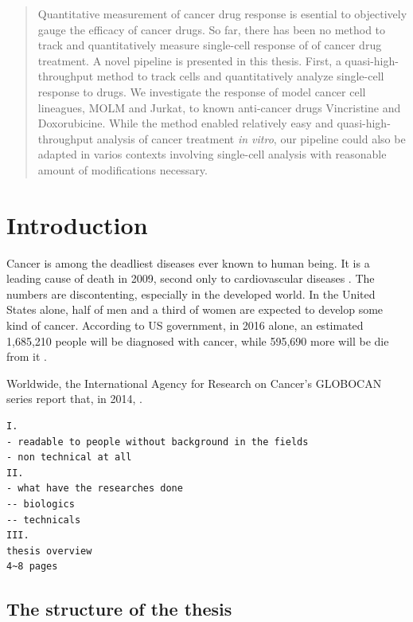 \documentclass[pdftex,12pt,a4paper]{report}
\begin{document}
\newpage


\begin{abstract}
Quantitative measurement of cancer drug response is esential to objectively gauge the efficacy of cancer drugs. So far, there has been no method to track and  quantitatively measure single-cell response of of cancer drug treatment. A novel pipeline is presented in this thesis. First, a quasi-high-throughput method to track cells and quantitatively analyze single-cell response to drugs. We investigate the response of model cancer cell lineagues, MOLM and Jurkat, to known anti-cancer drugs Vincristine and Doxorubicine. While the method enabled relatively easy and quasi-high-throughput analysis of cancer treatment \textit{in vitro}, our pipeline could also be adapted in varios contexts involving single-cell analysis with reasonable amount of modifications necessary.
\end{abstract}

\newpage

\tableofcontents

\newpage

\chapter{Introduction}

Cancer is among the deadliest diseases ever known to human being. It is a leading cause of death in 2009, second only to cardiovascular diseases \cite{sudhakar2009history}. The numbers are discontenting, especially in the developed world. In the United States alone, half of men and a third of women are expected to develop some kind of cancer. According to US government, in 2016 alone, an estimated 1,685,210 people will be diagnosed with cancer, while 595,690 more will be die from it \cite{cancergov2017stat}.

Worldwide, the International Agency for Research on Cancer's GLOBOCAN series report that, in 2014, \cite{ferlay2015cancer}.

\begin{verbatim}
I.
- readable to people without background in the fields
- non technical at all
II.
- what have the researches done
-- biologics
-- technicals
III.
thesis overview
4~8 pages
\end{verbatim}

\section{The structure of the thesis}
\end{document}
